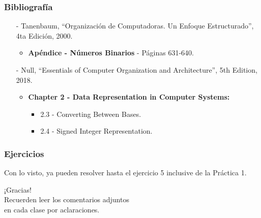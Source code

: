 \documentclass[aspectratio=169]{beamer}
\begin{document}
\begin{frame}[fragile]
    \frametitle{Bibliografía}
    \begin{itemize}
     \setlength\itemsep{0.5cm}
    \item[-] \small Tanenbaum, “Organización de Computadoras. Un Enfoque Estructurado”, 4ta Edición, 2000.\\
    \begin{itemize}
     \item \textbf{Apéndice - Números Binarios} - Páginas 631-640.
    \end{itemize}
    \item[-] \small Null, “Essentials of Computer Organization and Architecture”, 5th Edition, 2018.\\
    \begin{itemize}
     \item \textbf{Chapter 2 - Data Representation in Computer Systems:}
     \begin{itemize}
      \item 2.3 - Converting Between Bases.
      \item 2.4 - Signed Integer Representation.
     \end{itemize}
    \end{itemize}
    \end{itemize}
\end{frame}

\begin{frame}[fragile]
    \frametitle{Ejercicios}
    Con lo visto, ya pueden resolver hasta el ejercicio 5 inclusive de la Práctica 1.
\end{frame}

\begin{frame}[plain]
    \begin{center}
    \vspace{2cm}
    \huge ¡Gracias!\\
    \vspace{2cm}
    \normalsize Recuerden leer los comentarios adjuntos\\ en cada clase por aclaraciones.
    \end{center}
\end{frame}
\end{document}
